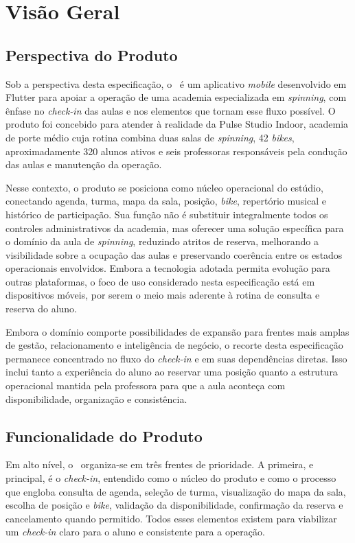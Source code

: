 \section{Visão Geral}

\subsection{Perspectiva do Produto}
Sob a perspectiva desta especificação, o \ProjetoNome\ é um aplicativo \textit{mobile} desenvolvido em Flutter para apoiar a operação de uma academia especializada em \textit{spinning}, com ênfase no \textit{check-in} das aulas e nos elementos que tornam esse fluxo possível. O produto foi concebido para atender à realidade da Pulse Studio Indoor, academia de porte médio cuja rotina combina duas salas de \textit{spinning}, 42 \textit{bikes}, aproximadamente 320 alunos ativos e seis professoras responsáveis pela condução das aulas e manutenção da operação.

Nesse contexto, o produto se posiciona como núcleo operacional do estúdio, conectando agenda, turma, mapa da sala, posição, \textit{bike}, repertório musical e histórico de participação. Sua função não é substituir integralmente todos os controles administrativos da academia, mas oferecer uma solução específica para o domínio da aula de \textit{spinning}, reduzindo atritos de reserva, melhorando a visibilidade sobre a ocupação das aulas e preservando coerência entre os estados operacionais envolvidos. Embora a tecnologia adotada permita evolução para outras plataformas, o foco de uso considerado nesta especificação está em dispositivos móveis, por serem o meio mais aderente à rotina de consulta e reserva do aluno.

Embora o domínio comporte possibilidades de expansão para frentes mais amplas de gestão, relacionamento e inteligência de negócio, o recorte desta especificação permanece concentrado no fluxo do \textit{check-in} e em suas dependências diretas. Isso inclui tanto a experiência do aluno ao reservar uma posição quanto a estrutura operacional mantida pela professora para que a aula aconteça com disponibilidade, organização e consistência.

\subsection{Funcionalidade do Produto}
Em alto nível, o \ProjetoNome\ organiza-se em três frentes de prioridade. A primeira, e principal, é o \textit{check-in}, entendido como o núcleo do produto e como o processo que engloba consulta de agenda, seleção de turma, visualização do mapa da sala, escolha de posição e \textit{bike}, validação da disponibilidade, confirmação da reserva e cancelamento quando permitido. Todos esses elementos existem para viabilizar um \textit{check-in} claro para o aluno e consistente para a operação.

